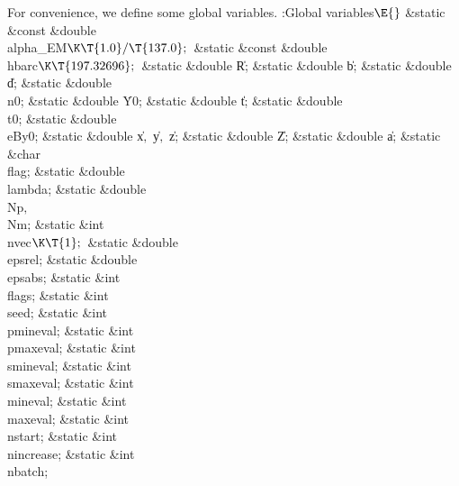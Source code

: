 \documentclass{cweb}
\begin{document}
For convenience, we define some global variables.
\Y\B\4:Global variables\X${}\E{}$\6
\&{static} \&{const} \&{double} \\{alpha\_EM}${}\K\T{1.0}/\T{137.0};{}$\6
\&{static} \&{const} \&{double} \\{hbarc}${}\K\T{197.32696};{}$\6
\&{static} \&{double} \|R;\6
\&{static} \&{double} \|b;\6
\&{static} \&{double} \|d;\6
\&{static} \&{double} \\{n0};\6
\&{static} \&{double} \.{Y0};\6
\&{static} \&{double} \|t;\6
\&{static} \&{double} \\{t0};\6
\&{static} \&{double} \\{eBy0};\6
\&{static} \&{double} \|x${},{}$ \|y${},{}$ \|z;%
\6
\&{static} \&{double} \|Z;\6
\&{static} \&{double} \|a;\6
\&{static} \&{char} \\{flag};\6
\&{static} \&{double} \\{lambda};\6
\&{static} \&{double} \\{Np}${},{}$ \\{Nm};\7
\&{static} \&{int} \\{nvec}${}\K\T{1};{}$\6
\&{static} \&{double} \\{epsrel};\6
\&{static} \&{double} \\{epsabs};\6
\&{static} \&{int} \\{flags};\6
\&{static} \&{int} \\{seed};\6
\&{static} \&{int} \\{pmineval};\6
\&{static} \&{int} \\{pmaxeval};\6
\&{static} \&{int} \\{smineval};\6
\&{static} \&{int} \\{smaxeval};\6
\&{static} \&{int} \\{mineval};\6
\&{static} \&{int} \\{maxeval};\6
\&{static} \&{int} \\{nstart};\6
\&{static} \&{int} \\{nincrease};\6
\&{static} \&{int} \\{nbatch};\6
\end{document}
